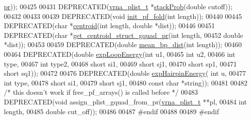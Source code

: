 \begin{DoxyCode}
      \hyperlink{fold__vars_8h_ac98ec419070aee6831b44e5c700f090f}{pr}));
00425 
00431 DEPRECATED(\hyperlink{group__data__structures_structvrna__plist__s}{vrna\_plist\_t} *\hyperlink{part__func_8h_ae856dd7a8d75c471c07153882bf1db48}{stackProb}(\textcolor{keywordtype}{double} cutoff));
00432 
00433 
00439 DEPRECATED(\textcolor{keywordtype}{void} \hyperlink{part__func_8h_a15176e23eceeff8c7d14eabcfec8a2af}{init\_pf\_fold}(\textcolor{keywordtype}{int} length));
00440 
00445 DEPRECATED(\textcolor{keywordtype}{char} *\hyperlink{part__func_8h_ae89a63bd83e75a80b2ba36d20b31ce81}{centroid}(\textcolor{keywordtype}{int} length, \textcolor{keywordtype}{double} *dist));
00446 
00451 DEPRECATED(\textcolor{keywordtype}{char} *\hyperlink{part__func_8h_a4e99e951dfdc006fe56c3a59374378ed}{get\_centroid\_struct\_gquad\_pr}(\textcolor{keywordtype}{int} length,
00452                                   \textcolor{keywordtype}{double} *dist));
00453 
00459 DEPRECATED(\textcolor{keywordtype}{double} \hyperlink{part__func_8h_ae9556ba7ded44fe2321b6f67c3fc02a3}{mean\_bp\_dist}(\textcolor{keywordtype}{int} length));
00460 
00464 DEPRECATED(\textcolor{keywordtype}{double} \hyperlink{part__func_8h_a68ba6f3a48e08ca131ab54621ce3a2d7}{expLoopEnergy}(\textcolor{keywordtype}{int} u1,
00465                                 \textcolor{keywordtype}{int} u2,
00466                                 \textcolor{keywordtype}{int} type,
00467                                 \textcolor{keywordtype}{int} type2,
00468                                 \textcolor{keywordtype}{short} si1,
00469                                 \textcolor{keywordtype}{short} sj1,
00470                                 \textcolor{keywordtype}{short} sp1,
00471                                 \textcolor{keywordtype}{short} sq1));
00472 
00476 DEPRECATED(\textcolor{keywordtype}{double} \hyperlink{part__func_8h_a7b6ab474cc80accc48010ccfcc59f96b}{expHairpinEnergy}( \textcolor{keywordtype}{int} u,
00477                                     \textcolor{keywordtype}{int} type,
00478                                     \textcolor{keywordtype}{short} si1,
00479                                     \textcolor{keywordtype}{short} sj1,
00480                                     \textcolor{keyword}{const} \textcolor{keywordtype}{char} *\textcolor{keywordtype}{string}));
00481 
00482 \textcolor{comment}{/* this doesn't work if free\_pf\_arrays() is called before */}
00483 DEPRECATED(\textcolor{keywordtype}{void} assign\_plist\_gquad\_from\_pr(\hyperlink{group__data__structures_structvrna__plist__s}{vrna\_plist\_t} **pl,
00484                                 \textcolor{keywordtype}{int} length,
00485                                 \textcolor{keywordtype}{double} cut\_off));
00486 
00487 \textcolor{preprocessor}{#endif}
00488 
00489 \textcolor{preprocessor}{#endif}
\end{DoxyCode}
